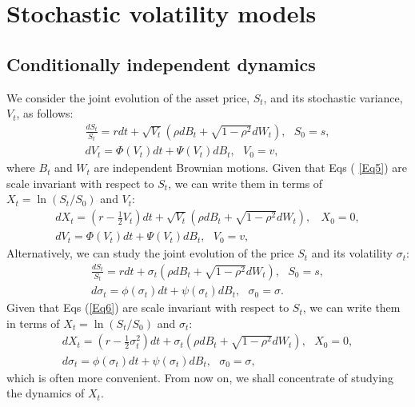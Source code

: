 \documentclass{article}
\begin{document}
\section{Stochastic volatility models\label{Sec2}}

\subsection{Conditionally independent dynamics\label{Sec21}}

We consider the joint evolution of the asset price, $S_{t}$, and its
stochastic variance, $V_{t}$, as follows: 
\begin{equation}
\begin{array}{c}
\frac{dS_{t}}{S_{t}}=rdt+\sqrt{V_{t}}\left( \rho dB_{t}+\sqrt{1-\rho ^{2}}%
dW_{t}\right) ,\ \ \ S_{0}=s, \\ 
dV_{t}=\Phi \left( V_{t}\right) dt+\Psi \left( V_{t}\right) dB_{t},\ \ \
V_{0}=v,%
\end{array}
\label{Eq5}
\end{equation}%
where $B_{t}$ and $W_{t}$ are independent Brownian motions. Given that Eqs (%
\ref{Eq5}) are scale invariant with respect to $S_{t}$, we can write them in
terms of $X_{t}=\ln \left( S_{t}/S_{0}\right) $ and $V_{t}$:%
\begin{equation}
\begin{array}{c}
dX_{t}=\left( r-\frac{1}{2}V_{t}\right) dt+\sqrt{V_{t}}\left( \rho dB_{t}+%
\sqrt{1-\rho ^{2}}dW_{t}\right) ,\ \ \ \ X_{0}=0, \\ 
dV_{t}=\Phi \left( V_{t}\right) dt+\Psi \left( V_{t}\right) dB_{t},\ \ \
V_{0}=v,%
\end{array}
\label{Eq7}
\end{equation}%
Alternatively, we can study the joint evolution of the price $S_{t}$ and its
volatility $\sigma _{t}$:%
\begin{equation}
\begin{array}{c}
\frac{dS_{t}}{S_{t}}=rdt+\sigma _{t}\left( \rho dB_{t}+\sqrt{1-\rho ^{2}}%
dW_{t}\right) ,\ \ \ S_{0}=s, \\ 
d\sigma _{t}=\phi \left( \sigma _{t}\right) dt+\psi \left( \sigma
_{t}\right) dB_{t},\ \ \ \sigma _{0}=\sigma .%
\end{array}
\label{Eq6}
\end{equation}%
Given that Eqs (\ref{Eq6}) are scale invariant with respect to $S_{t}$, we
can write them in terms of $X_{t}=\ln \left( S_{t}/S_{0}\right) $ and $%
\sigma _{t}$:%
\begin{equation}
\begin{array}{c}
dX_{t}=\left( r-\frac{1}{2}\sigma _{t}^{2}\right) dt+\sigma _{t}\left( \rho
dB_{t}+\sqrt{1-\rho ^{2}}dW_{t}\right) ,\ \ \ X_{0}=0, \\ 
d\sigma _{t}=\phi \left( \sigma _{t}\right) dt+\psi \left( \sigma
_{t}\right) dB_{t},\ \ \ \sigma _{0}=\sigma ,%
\end{array}
\label{Eq8}
\end{equation}%
which is often more convenient. From now on, we shall concentrate of
studying the dynamics of $X_{t}$.
\end{document}
